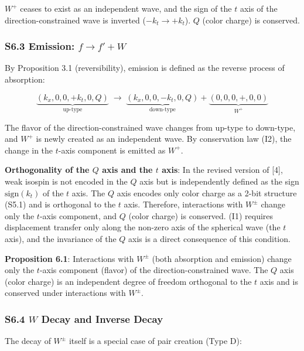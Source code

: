 \documentclass[
  a4paper,11pt]{article}
\theoremstyle{definition}
\theoremstyle{remark}
\begin{document}
\(W^+\) ceases to exist as an independent wave, and the sign of the
\(t\) axis of the direction-constrained wave is inverted
(\(-k_t \to +k_t\)). \(Q\) (color charge) is conserved.

\subsubsection{\texorpdfstring{S6.3 Emission:
\(f \to f' + W\)}{S6.3 Emission: f \textbackslash to f\textquotesingle{} + W}}\label{s6.3-emission-f-to-f-w}

By Proposition 3.1 (reversibility), emission is defined as the reverse
process of absorption:

\[\underbrace{(k_x, 0, 0, +k_t, 0, Q)}_{\text{up-type}} \;\longrightarrow\; \underbrace{(k_x, 0, 0, -k_t, 0, Q)}_{\text{down-type}} + \underbrace{(0, 0, 0, +, 0, 0)}_{W^+}\]

The flavor of the direction-constrained wave changes from up-type to
down-type, and \(W^+\) is newly created as an independent wave. By
conservation law (I2), the change in the \(t\)-axis component is emitted
as \(W^+\).

\textbf{Orthogonality of the \(Q\) axis and the \(t\) axis}: In the
revised version of {[}4{]}, weak isospin is not encoded in the \(Q\)
axis but is independently defined as the sign \(\mathrm{sign}(k_t)\) of
the \(t\) axis. The \(Q\) axis encodes only color charge as a 2-bit
structure (S5.1) and is orthogonal to the \(t\) axis. Therefore,
interactions with \(W^{\pm}\) change only the \(t\)-axis component, and
\(Q\) (color charge) is conserved. (I1) requires displacement transfer
only along the non-zero axis of the spherical wave (the \(t\) axis), and
the invariance of the \(Q\) axis is a direct consequence of this
condition.

\textbf{Proposition 6.1}: Interactions with \(W^{\pm}\) (both absorption
and emission) change only the \(t\)-axis component (flavor) of the
direction-constrained wave. The \(Q\) axis (color charge) is an
independent degree of freedom orthogonal to the \(t\) axis and is
conserved under interactions with \(W^{\pm}\).

\subsubsection{\texorpdfstring{S6.4 \(W\) Decay and Inverse
Decay}{S6.4 W Decay and Inverse Decay}}\label{s6.4-w-decay-and-inverse-decay}

The decay of \(W^{\pm}\) itself is a special case of pair creation (Type
D):
\end{document}
